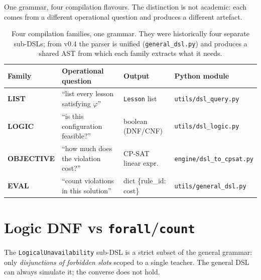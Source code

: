 One grammar, four compilation flavours. The distinction is not
academic: each comes from a different operational question and
produces a different artefact.

\begin{table}[h]
\centering
\sffamily\small
\begin{tabular}{lp{3.4cm}p{3.4cm}p{3.4cm}}
\toprule
Family & Operational question & Output & Python module \\
\midrule
\textbf{LIST}      & ``list every lesson satisfying $\varphi$'' & \texttt{Lesson} list & \texttt{utils/dsl\_query.py} \\
\textbf{LOGIC}     & ``is this configuration feasible?''        & boolean (DNF/CNF) & \texttt{utils/dsl\_logic.py} \\
\textbf{OBJECTIVE} & ``how much does the violation cost?''      & CP-SAT linear expr. & \texttt{engine/dsl\_to\_cpsat.py} \\
\textbf{EVAL}      & ``count violations in this solution''      & dict \{rule\_id: cost\} & \texttt{utils/general\_dsl.py} \\
\bottomrule
\end{tabular}
\caption{Four compilation families, one grammar. They were
historically four separate sub-DSLs; from v0.4 the parser is
unified (\texttt{general\_dsl.py}) and produces a shared AST
from which each family extracts what it needs.}
\label{tab:dsl-families-en}
\end{table}

\section{Logic DNF vs \texttt{forall}/\texttt{count}}
\label{sec:dsl-logic-vs-forall-en}

The \texttt{LogicalUnavailability} sub-DSL is a strict subset
of the general grammar: only \emph{disjunctions of forbidden
slots} scoped to a single teacher. The general DSL can always
simulate it; the converse does not hold.

